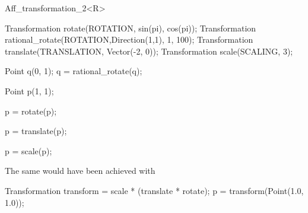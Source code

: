 \begin{ccRefClass}{Aff_transformation_2<R>}
\begin{cprog}
  Transformation rotate(ROTATION, sin(pi), cos(pi));
  Transformation rational_rotate(ROTATION,Direction(1,1), 1, 100);
  Transformation translate(TRANSLATION, Vector(-2, 0));
  Transformation scale(SCALING, 3);

  Point q(0, 1);
  q = rational_rotate(q); 

  Point p(1, 1);

  p = rotate(p); 

  p = translate(p); 

  p = scale(p);
\end{cprog} 

The same would have been achieved with

\begin{cprog}

  Transformation transform = scale * (translate * rotate);
  p = transform(Point(1.0, 1.0));
\end{cprog} 

\ccSeeAlso
{} \\
 \\
 \\
 \\
 \\
 \\

\end{ccRefClass} 

